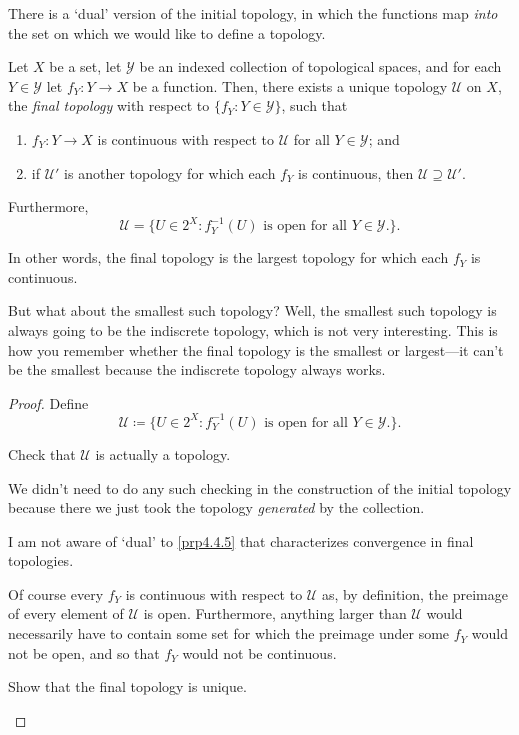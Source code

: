There is a `dual' version of the initial topology, in which the functions map \emph{into} the set on which we would like to define a topology.
\begin{prp}\label{FinalTopology}
\begin{savenotes}
Let $X$ be a set, let $\mathcal{Y}$ be an indexed collection of topological spaces, and for each $Y\in \mathcal{Y}$ let $f_Y:Y\rightarrow X$ be a function.  Then, there exists a unique topology $\mathcal{U}$ on $X$, the \emph{final topology} with respect to $\{ f_Y:Y\in \mathcal{Y}\}$, such that
\begin{enumerate}
\item $f_Y:Y\rightarrow X$ is continuous with respect to $\mathcal{U}$ for all $Y\in \mathcal{Y}$; and
\item if $\mathcal{U}'$ is another topology for which each $f_Y$ is continuous, then $\mathcal{U}\supseteq \mathcal{U}'$.
\end{enumerate}
Furthermore,
\begin{equation}
\mathcal{U}=\{ U\in 2^X:f_Y^{-1}(U)\text{ is open for all }Y\in \mathcal{Y}\text{.}\} .
\end{equation}
\begin{rmk}
In other words, the final topology is the largest topology for which each $f_Y$ is continuous.
\end{rmk}
\begin{rmk}
But what about the smallest such topology?  Well, the smallest such topology is always going to be the indiscrete topology, which is not very interesting.  This is how you remember whether the final topology is the smallest or largest---it can't be the smallest because the indiscrete topology always works.
\end{rmk}
\begin{proof}
Define
\begin{equation}\label{3.4.9}
\mathcal{U}\coloneqq \{ U\in 2^X:f_Y^{-1}(U)\text{ is open for all }Y\in \mathcal{Y}\text{.}\} .
\end{equation}
\begin{exr}
Check that $\mathcal{U}$ is actually a topology.
\begin{rmk}
We didn't need to do any such checking in the construction of the initial topology because there we just took the topology \emph{generated} by the collection.
\end{rmk}
\begin{rmk}
I am not aware of `dual' to \cref{prp4.4.5} that characterizes convergence in final topologies.
\end{rmk}
\end{exr}
Of course every $f_Y$ is continuous with respect to $\mathcal{U}$ as, by definition, the preimage of every element of $\mathcal{U}$ is open.  Furthermore, anything larger than $\mathcal{U}$ would necessarily have to contain some set for which the preimage under some $f_Y$ would not be open, and so that $f_Y$ would not be continuous.
\begin{exr}
Show that the final topology is unique.
\end{exr}
\end{proof}
\end{savenotes}
\end{prp}
